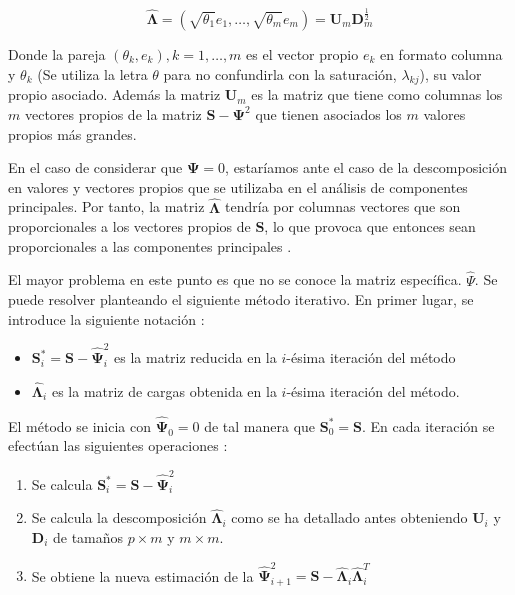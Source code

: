 \begin{equation}
\mathbf{\hat{\Lambda}}=(\sqrt{\theta_1}e_1,\ldots,\sqrt{\theta_m}e_m)=\mathbf{U}_m\mathbf{D}_m^{\frac{1}{2}}
\end{equation}

\noindent Donde la pareja $(\theta_k, e_k), k=1, \ldots, m$ es el vector propio $e_k$ en formato columna y $\theta_k$ (Se utiliza la letra $\theta$ para no confundirla con la saturación, $\lambda_{kj}$), su valor propio asociado. Además la matriz $\mathbf{U}_m$ es la matriz que tiene como columnas los $m$ vectores propios de la matriz $\mathbf{S}-\mathbf{\Psi}^2$ que tienen asociados los $m$ valores propios más grandes. 

\noindent En el caso de considerar que $\mathbf{\Psi}=0$, estaríamos ante el caso de la descomposición en valores y vectores propios que se utilizaba en el análisis de componentes principales. Por tanto, la matriz $\mathbf{\hat{\Lambda}}$ tendría por columnas vectores que son proporcionales a los vectores propios de $\mathbf{S}$, lo que provoca que entonces sean proporcionales a las componentes principales \cite{Rencher 2002}. 

\noindent El mayor problema en este punto es que no se conoce la matriz específica.  $\hat{\Psi}$. Se puede resolver planteando el siguiente método iterativo. En primer lugar, se introduce la siguiente notación :
\begin{itemize}
\item $\mathbf{S}_i^*=\mathbf{S}-\hat{\mathbf{\Psi}}_i^2$ es la matriz reducida en la $i$-ésima iteración del método
\item $\mathbf{\hat{\Lambda}}_i$ es la matriz de cargas obtenida en la $i$-ésima iteración del método. 
\end{itemize}
\noindent El método se inicia con $\mathbf{\hat{\Psi}}_0=0$ de tal manera que $\mathbf{S}_0^*=\mathbf{S}$. En cada iteración se efectúan las siguientes operaciones \cite{Cuadras 2014, Johnson 2007, Peña 2002}: 
\begin{enumerate}
\item Se calcula $\mathbf{S}_i^*=\mathbf{S-\hat{\Psi}}_i^2$
\item Se calcula la descomposición $\mathbf{\hat{\Lambda}}_i$ como se ha detallado antes obteniendo $\mathbf{U}_i$ y $\mathbf{D}_i$ de tamaños $p\times m $ y $m\times m$. 
\item Se obtiene la nueva estimación de la $\mathbf{\hat{\Psi}}_{i+1}^2=\mathbf{S}-\mathbf{\hat{\Lambda}}_i\mathbf{\hat{\Lambda}}_i^T$
\end{enumerate}

